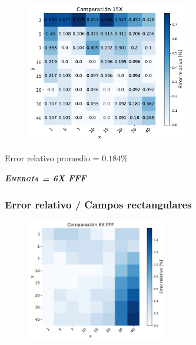\documentclass[aspectratio=169,xcolor=dvipsnames,t]{beamer}
\begin{document}
\begin{frame}

      \begin{figure}
            \centering
            \includegraphics[width=0.63\textwidth]{15X_hm2.pdf}
      \end{figure}

      \vspace{-20pt}
      \begin{flushright}
      \tiny{Error relativo promedio = $0.184 \%$}
      \end{flushright}

\end{frame}



\begin{frame}[standout]
      \centering\LARGE
      \textbf{\itshape\scshape Energía = 6X FFF} 
\end{frame}


\begin{frame}
      \frametitle{Error relativo / Campos rectangulares}

      \begin{figure}
            \centering
            \includegraphics[width=0.55\textwidth]{6FFF_hm1.pdf}
      \end{figure}

\end{frame}
\end{document}
